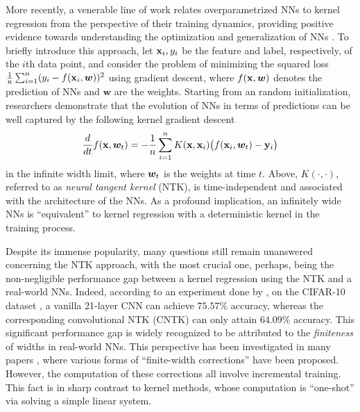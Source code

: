 More recently, a venerable line of work relates overparametrized NNs to kernel regression from the perspective of their training dynamics, providing positive evidence towards understanding the optimization and generalization of NNs \citep{jacot2018neural,chizat2018note,cao2019generalization,lee2019wide,arora2019exact,chizat2019lazy,du2019graph,li2019enhanced,zou2020gradient}. To briefly introduce this approach, let ${\mathbf{x}}_i, y_i$ be the feature and label, respectively, of the $i$th data point, and consider the problem of minimizing the squared loss $\frac1n\sum_{i=1}^n (y_i - f({\mathbf{x}}_i, {\boldsymbol{w}}))^2$ using gradient descent, where $f({\mathbf{x}}, {\boldsymbol{w}})$ denotes the prediction of NNs and $\bm w$ are the weights. Starting from an random initialization, researchers demonstrate that the evolution of NNs in terms of predictions  can be well captured by the following kernel gradient descent
\begin{equation}
	\label{eq: grad_flow_f}
	\frac{d}{dt}f({\mathbf{x}}, {\boldsymbol{w}}_t) = - \frac{1}{n} \sum_{i = 1}^n {K ({\mathbf{x}}, {\mathbf{x}}_i)} \bigl(f({\mathbf{x}}_i, {\boldsymbol{w}}_t) - {\mathbf{y}}_i\bigr)
\end{equation}
in the infinite width limit, where ${\boldsymbol{w}}_t$ is the weights at time $t$. Above, $K(\cdot, \cdot)$, referred to as \emph{neural tangent kernel} (NTK), is time-independent and associated with the architecture of the NNs. As a profound implication, an infinitely wide NNs is ``equivalent'' to kernel regression with a {deterministic kernel} in the training process.

Despite its immense popularity, many questions still remain unanswered concerning the NTK approach, with the most crucial one, perhaps, being the non-negligible performance gap between a kernel regression using the NTK and a real-world NNs. Indeed, according to an experiment done by \cite{arora2019exact}, on the CIFAR-10 dataset \citep{krizhevsky2009learning}, a vanilla 21-layer CNN can achieve $75.57\%$ accuracy, whereas the corresponding convolutional NTK (CNTK) can only attain $64.09\%$ accuracy. This significant performance gap is widely recognized to be attributed to the \textit{finiteness} of widths in real-world NNs. This perspective has been investigated in many papers \citep{hanin2019finite,huang2019dynamics,bai2019beyond,bai2020taylorized}, where various forms of ``finite-width corrections'' have been proposed. However, the computation of these corrections all involve incremental training. This fact is in sharp contrast to kernel methods, whose computation is ``one-shot'' via solving a simple linear system.


